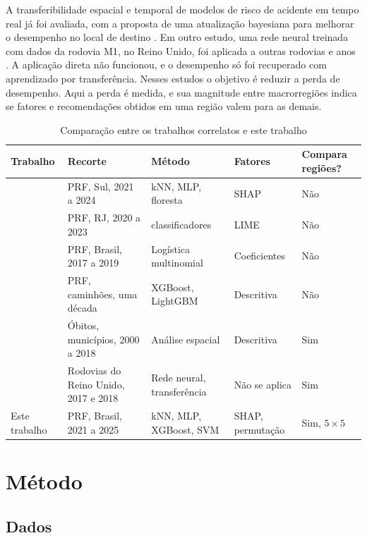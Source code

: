 \documentclass[12pt]{article}
\begin{document}
A transferibilidade espacial e temporal de modelos de risco de acidente
em tempo real já foi avaliada, com a proposta de uma atualização
bayesiana para melhorar o desempenho no local de destino \cite{xu2014}.
Em outro estudo, uma rede neural treinada com dados da rodovia M1, no
Reino Unido, foi aplicada a outras rodovias e anos \cite{man2022}. A
aplicação direta não funcionou, e o desempenho só foi recuperado com
aprendizado por transferência. Nesses estudos o objetivo é reduzir a
perda de desempenho. Aqui a perda é medida, e sua magnitude entre
macrorregiões indica se fatores e recomendações obtidos em uma região
valem para as demais.

\begin{table}[H]
\centering
\caption{Comparação entre os trabalhos correlatos e este trabalho}
\label{tab:correlatos}
\footnotesize
\setlength{\tabcolsep}{4pt}
\begin{tabular}{>{\raggedright\arraybackslash}p{4.1cm}>{\raggedright\arraybackslash}p{3.3cm}>{\raggedright\arraybackslash}p{2.8cm}>{\raggedright\arraybackslash}p{1.9cm}>{\raggedright\arraybackslash}p{1.5cm}}
\toprule
Trabalho & Recorte & Método & Fatores & Compara regiões? \\
\midrule
\cite{gabardo2025} & PRF, Sul, 2021 a 2024 & kNN, MLP, floresta & SHAP & Não \\
\cite{mafort2025} & PRF, RJ, 2020 a 2023 & 7 classificadores & LIME & Não \\
\cite{franceschi2022} & PRF, Brasil, 2017 a 2019 & Logística multinomial & Coeficientes & Não \\
\cite{soliani2024} & PRF, caminhões, uma década & XGBoost, LightGBM & Descritiva & Não \\
\cite{malta2023} & Óbitos, municípios, 2000 a 2018 & Análise espacial & Descritiva & Sim \\
\cite{man2022} & Rodovias do Reino Unido, 2017 e 2018 & Rede neural, transferência & Não se aplica & Sim \\
Este trabalho & PRF, Brasil, 2021 a 2025 & kNN, MLP, XGBoost, SVM & SHAP, permutação & Sim, $5\times5$ \\
\bottomrule
\end{tabular}
\end{table}


\section{Método}

\subsection{Dados}
\end{document}
